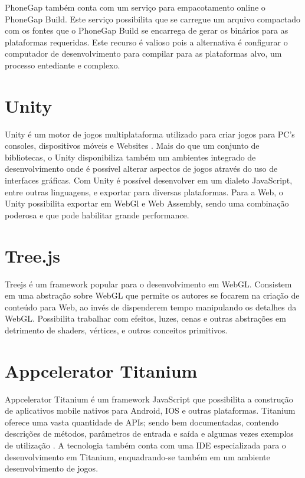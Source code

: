 PhoneGap também conta com um serviço para empacotamento online o
PhoneGap Build. Este serviço possibilita que se carregue um arquivo
compactado com os fontes que o PhoneGap Build se encarrega de gerar os
binários para as plataformas requeridas. Este recurso é valioso pois a
alternativa é configurar o computador de desenvolvimento para compilar
para as plataformas alvo, um processo entediante e complexo.

\section{Unity}

Unity é um motor de jogos multiplataforma utilizado para criar jogos
para PC's consoles, dispositivos móveis e Websites \textsc{\autocite{unity}}.
Mais do que um conjunto de bibliotecas, o Unity disponibiliza também
um ambientes integrado de desenvolvimento onde é possível alterar
aspectos de jogos através do uso de interfaces gráficas. Com Unity é possível
desenvolver em um dialeto JavaScript, entre outras linguagens, e
exportar para diversas plataformas. Para a Web, o Unity possibilita
exportar em WebGl e Web Assembly, sendo uma combinação poderosa e que
pode habilitar grande performance.

\section{Tree.js}

Treejs é um framework popular para o desenvolvimento em WebGL.
Consistem em uma abstração sobre WebGL que permite os autores se
focarem na criação de conteúdo para Web, ao invés de dispenderem
tempo manipulando os detalhes da WebGL. Possibilita trabalhar com
efeitos, luzes, cenas e outras abstrações em detrimento de shaders,
vértices, e outros conceitos primitivos.

\section{Appcelerator Titanium}

Appcelerator Titanium é um framework JavaScript que possibilita a
construção de aplicativos mobile nativos para Android, IOS e outras
plataformas. Titanium oferece uma vasta quantidade de APIs; sendo
bem documentadas, contendo descrições de métodos, parâmetros de
entrada e saída e algumas vezes exemplos de utilização \autocite[p.
2]{crossPlatformAppsAnimations}. A tecnologia também conta com uma IDE
especializada para o desenvolvimento em Titanium, enquadrando-se também
em um ambiente desenvolvimento de jogos.

